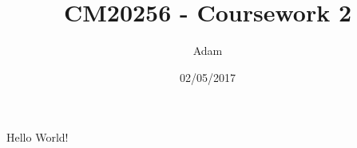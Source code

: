\documentclass{article}
\title{CM20256 - Coursework 2}
\date{02/05/2017}
\author{Adam}
\begin{document}
\maketitle
\newpage
{}
 Hello World!
\end{document}
